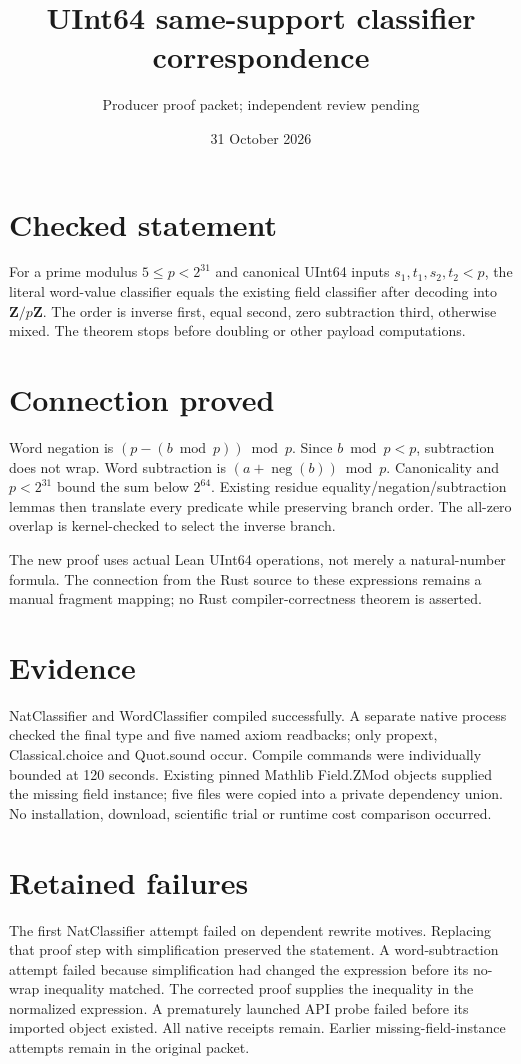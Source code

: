 \documentclass[10pt]{article}
\begin{document}
\title{UInt64 same-support classifier correspondence}
\author{Producer proof packet; independent review pending}
\date{31 October 2026}\maketitle
\section*{Checked statement}
For a prime modulus $5\le p<2^{31}$ and canonical UInt64 inputs $s_1,t_1,s_2,t_2<p$, the literal word-value classifier equals the existing field classifier after decoding into $\mathbf Z/p\mathbf Z$. The order is inverse first, equal second, zero subtraction third, otherwise mixed. The theorem stops before doubling or other payload computations.
\section*{Connection proved}
Word negation is $(p-(b\bmod p))\bmod p$. Since $b\bmod p<p$, subtraction does not wrap. Word subtraction is $(a+\operatorname{neg}(b))\bmod p$. Canonicality and $p<2^{31}$ bound the sum below $2^{64}$. Existing residue equality/negation/subtraction lemmas then translate every predicate while preserving branch order. The all-zero overlap is kernel-checked to select the inverse branch.

The new proof uses actual Lean UInt64 operations, not merely a natural-number formula. The connection from the Rust source to these expressions remains a manual fragment mapping; no Rust compiler-correctness theorem is asserted.
\section*{Evidence}
NatClassifier and WordClassifier compiled successfully. A separate native process checked the final type and five named axiom readbacks; only propext, Classical.choice and Quot.sound occur. Compile commands were individually bounded at 120 seconds. Existing pinned Mathlib Field.ZMod objects supplied the missing field instance; five files were copied into a private dependency union. No installation, download, scientific trial or runtime cost comparison occurred.
\section*{Retained failures}
The first NatClassifier attempt failed on dependent rewrite motives. Replacing that proof step with simplification preserved the statement. A word-subtraction attempt failed because simplification had changed the expression before its no-wrap inequality matched. The corrected proof supplies the inequality in the normalized expression. A prematurely launched API probe failed before its imported object existed. All native receipts remain. Earlier missing-field-instance attempts remain in the original packet.
\end{document}
